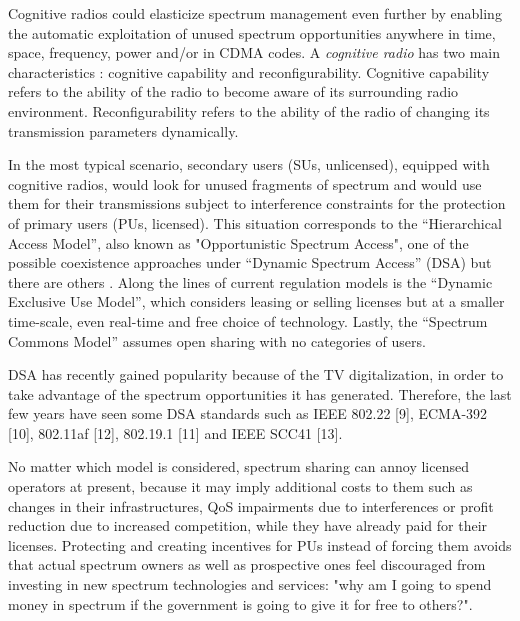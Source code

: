 Cognitive radios \cite{ref:Mitola1999} could elasticize spectrum management even further by enabling the automatic exploitation of unused spectrum opportunities anywhere in time, space, frequency, power and/or in CDMA codes.
A \emph{cognitive radio} has two main characteristics \cite{ref:Akyildiz2006}: cognitive capability and reconfigurability. 
Cognitive capability refers to the ability of the radio to become aware of its surrounding radio environment. Reconfigurability refers to the ability of the radio of changing its transmission parameters dynamically.

In the most typical scenario, secondary users (SUs, unlicensed), equipped with cognitive radios, would look for unused fragments of spectrum and would use them for their transmissions subject to interference constraints for the protection of primary users (PUs, licensed). 
This situation corresponds to the “Hierarchical Access Model”, also known as "Opportunistic Spectrum Access", one of the possible coexistence approaches under “Dynamic Spectrum Access” (DSA) but there are others \cite{ref:Zhao2007}. 
Along the lines of current regulation models is the “Dynamic Exclusive Use Model”, which considers leasing or selling licenses but at a smaller time-scale, even real-time and free choice of technology.
Lastly, the “Spectrum Commons Model”  assumes open sharing with no categories of users.

DSA has recently gained popularity because of the TV digitalization, in order to take advantage of the spectrum opportunities it has generated. %
Therefore, the last few years have seen some DSA standards such as IEEE 802.22 [9], ECMA-392 [10], 802.11af [12], 802.19.1 [11] and IEEE SCC41 [13].

No matter which model is considered, spectrum sharing can annoy licensed operators at present, because it may imply additional costs to them such as changes in their infrastructures, QoS impairments due to interferences or profit reduction due to increased competition, while they have already paid for their licenses. 
Protecting and creating incentives for PUs instead of forcing them avoids that actual spectrum owners as well as prospective ones feel discouraged from investing in new spectrum technologies and services: "why am I going to spend money in spectrum if the government is going to give it for free to others?".

